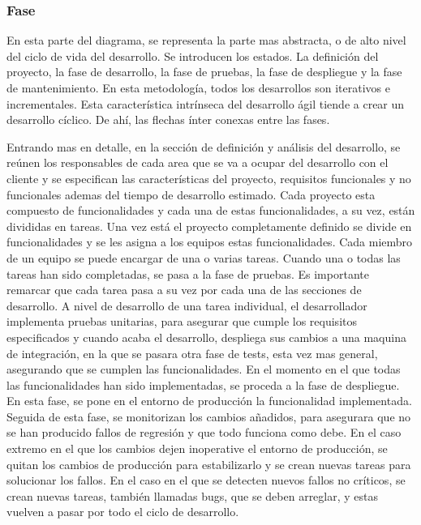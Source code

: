 \documentclass[12pt]{report} %
\begin{document}
\subsubsection{Fase} 

En esta parte del diagrama, se representa la parte mas abstracta, o de alto
nivel del ciclo de vida del desarrollo.
Se introducen los estados.
La definición del proyecto, la fase de desarrollo, la fase de pruebas, la fase
de despliegue y la fase de mantenimiento.
En esta metodología, todos los desarrollos son iterativos e incrementales.
Esta característica intrínseca del desarrollo ágil tiende a crear un 
desarrollo cíclico.
De ahí, las flechas ínter conexas entre las fases.

Entrando mas en detalle, en la sección de definición y análisis del desarrollo,
se reúnen los responsables de cada area que se va a ocupar del desarrollo con el
cliente y se especifican las características del proyecto, requisitos
funcionales y no funcionales ademas del tiempo de desarrollo estimado.
Cada proyecto esta compuesto de funcionalidades y cada una de estas
funcionalidades, a su vez, están divididas en tareas.
Una vez está el proyecto completamente definido se divide en funcionalidades y
se les asigna a los equipos estas funcionalidades.
Cada miembro de un equipo se puede encargar de una o varias tareas. 
Cuando una o todas las tareas han sido completadas, se pasa a la fase de
pruebas.
Es importante remarcar que cada tarea pasa a su vez por cada una de las
secciones de desarrollo.
A nivel de desarrollo de una tarea individual, el desarrollador implementa
pruebas unitarias, para asegurar que cumple los requisitos especificados y
cuando acaba el desarrollo, despliega sus cambios a una maquina de integración,
en la que se pasara otra fase de tests, esta vez mas general, asegurando que se
cumplen las funcionalidades.
En el momento en el que todas las funcionalidades han sido implementadas, se
proceda a la fase de despliegue.
En esta fase, se pone en el entorno de producción la funcionalidad implementada.
Seguida de esta fase, se monitorizan los cambios añadidos, para asegurara que no
se han producido fallos de regresión y que todo funciona como debe.
En el caso extremo en el que los cambios dejen inoperative el entorno de
producción, se quitan los cambios de producción para estabilizarlo y se crean
nuevas tareas para solucionar los fallos.
En el caso en el que se detecten nuevos fallos no críticos, se crean nuevas
tareas, también llamadas bugs, que se deben arreglar, y estas vuelven a pasar
por todo el ciclo de desarrollo.
\end{document}
